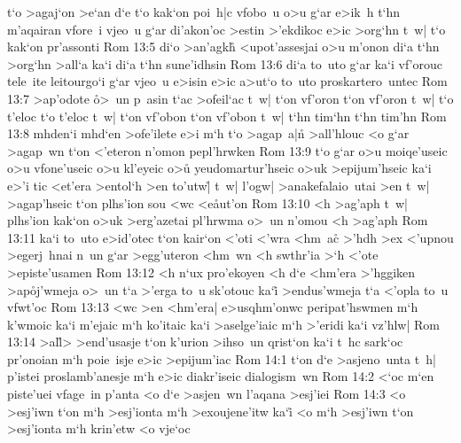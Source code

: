 t`o
>agaj`on
>e`an
d`e
t`o
kak`on
poi~h|c
vfobo~u
o>u
g`ar
e>ik~h
t`hn
m'aqairan
vfore~i
vjeo~u
g`ar
di'akon'oc
>estin
>'ekdikoc
e>ic
>org`hn
t~w|
t`o
kak`on
pr'assonti\bibvsend
\vs Rom 13:5
di`o
>an'agkh\r{}
<upot'assesjai
o>u
m'onon
di`a
t`hn
>org`hn
>all`a
ka`i
di`a
t`hn
sune'idhsin\bibvsend
\vs Rom 13:6
di`a
to~uto
g`ar
ka`i
vf'orouc
tele~ite
leitourgo`i
g`ar
vjeo~u
e>isin
e>ic
a>ut`o
to~uto
proskartero~untec\bibvsend
\vs Rom 13:7
>ap'odote
\r{o}>~un
p~asin
t`ac
>ofeil`ac
t~w|
t`on
vf'oron
t`on
vf'oron
t~w|
t`o
t'eloc
t`o
t'eloc
t~w|
t`on
vf'obon
t`on
vf'obon
t~w|
t`hn
tim`hn
t`hn
tim'hn\bibvsend
\vs Rom 13:8
mhden`i
mhd`en
>ofe'ilete
e>i
m`h
t`o
>agap~a|n\r{}
>all'hlouc
<o
g`ar
>agap~wn
t`on
<'eteron
n'omon
pepl'hrwken\bibvsend
\vs Rom 13:9
t`o
g`ar
o>u
moiqe'useic
o>u
vfone'useic
o>u
kl'eyeic
o>u\r{}
yeudomartur'hseic
o>uk
>epijum'hseic
ka`i
e>'i
tic
<et'era
>entol`h
>en
to'utw|\r{}
t~w|
l'ogw|
>anakefalaio~utai
>en
t~w|
>agap'hseic
t`on
plhs'ion
sou
<wc
<e\r{a}ut'on\bibvsend
{}
\vs Rom 13:10
<h
>ag'aph
t~w|
plhs'ion
kak`on
o>uk
>erg'azetai
pl'hrwma
o>~un
n'omou
<h
>ag'aph\bibvsend
\vs Rom 13:11
ka`i
to~uto
e>id'otec
t`on
kair`on
<'oti
<'wra
<hm~ac\r{}
>'hdh
>ex
<'upnou
>egerj~hnai
n~un
g`ar
>egg'uteron
<hm~wn
<h
swthr'ia
>`h
<'ote
>episte'usamen\bibvsend
\vs Rom 13:12
<h
n`ux
pro'ekoyen
<h
d`e
<hm'era
>'hggiken
>ap\r{o}j'wmeja
o>~un
t`a
>'erga
to~u
sk'otouc
ka`i\r{}
>endus'wmeja
t`a
<'opla
to~u
vfwt'oc\bibvsend
\vs Rom 13:13
<wc
>en
<hm'era|
e>usqhm'onwc
peripat'hswmen
m`h
k'wmoic
ka`i
m'ejaic
m`h
ko'itaic
ka`i
>aselge'iaic
m`h
>'eridi
ka`i
vz'hlw|\bibvsend
\vs Rom 13:14
>al\r{l}>
>end'usasje
t`on
k'urion
>ihso~un
qrist`on
ka`i
t~hc
sark`oc
pr'onoian
m`h
poie~isje
e>ic
>epijum'iac\bibvsend
\vs Rom 14:1
t`on
d`e
>asjeno~unta
t~h|
p'istei
proslamb'anesje
m`h
e>ic
diakr'iseic
dialogism~wn\bibvsend
\vs Rom 14:2
<`oc
m`en
piste'uei
vfage~in
p'anta
<o
d`e
>asjen~wn
l'aqana
>esj'iei\bibvsend
\vs Rom 14:3
<o
>esj'iwn
t`on
m`h
>esj'ionta
m`h
>exoujene'itw
ka`i\r{}
<o
m`h
>esj'iwn
t`on
>esj'ionta
m`h
krin'etw
<o
vje`oc
